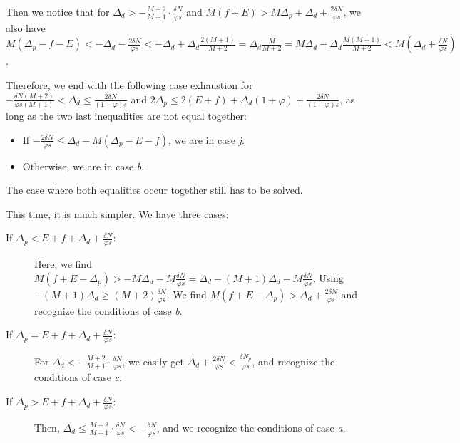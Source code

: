 \documentclass[english, a4paper]{article}
\theoremstyle{plain}
\theoremstyle{definition}
\theoremstyle{remark}
\begin{document}
\begin{description}
\begin{description}
        Then we notice that for $\Delta_d > -\frac{M+2}{M+1}\cdot\frac{\delta N}{\varphi s}$ and $M(f+E) > M\Delta_p + \Delta_d + \frac{2\delta N}{\varphi s}$, we also have $M(\Delta_p - f - E) < -\Delta_d - \frac{2\delta N}{\varphi s} < -\Delta_d + \Delta_d \frac{2(M+1)}{M+2} = \Delta_d \frac{M}{M+2} = M\Delta_d - \Delta_d \frac{M(M+1)}{M+2} < M(\Delta_d + \frac{\delta N}{\varphi s})$.

        Therefore, we end with the following case exhaustion for $-\frac{\delta N(M+2)}{\varphi s(M+1)} < \Delta_d \leq \frac{2\delta N}{(1-\varphi)s}$ and $2\Delta_p \leq 2(E + f) + \Delta_d (1 + \varphi) + \frac{2\delta N}{(1 - \varphi )s}$, as long as the two last inequalities are not equal together:
        \begin{itemize}
            \item If $-\frac{2\delta N}{\varphi s} \leq \Delta_d + M(\Delta_p - E - f)$, we are in case \emph{j}.
            \item Otherwise, we are in case \emph{b}.
        \end{itemize}

        The case where both equalities occur together still has to be solved. %

    \end{description}    
    \item[Case $\Delta_d \leq-\frac{\delta N(M+2)}{\varphi s(M+1)}$:] This time, it is much simpler. We have three cases:
    \begin{description}
        \item[If $\Delta_p < E + f + \Delta_d + \frac{\delta N}{\varphi s}$:] Here, we find $M(f+E-\Delta_p) > -M \Delta_d - M\frac{\delta N}{\varphi s} = \Delta_d - (M+1)\Delta_d - M\frac{\delta N}{\varphi s}$. Using $-(M+1) \Delta_d \geq (M+2)\frac{\delta N}{\varphi s}$. We find $M(f+E - \Delta_p) > \Delta_d + \frac{2 \delta N}{\varphi s}$ and recognize the conditions of case \emph{b}.

        \item[If $\Delta_p = E + f+ \Delta_d + \frac{\delta N}{\varphi s}$:] For $\Delta_d < -\frac{M+2}{M+1}\cdot\frac{\delta N}{\varphi s}$, we easily get $\Delta_d + \frac{2\delta N}{\varphi s} < \frac{\delta N_p}{\varphi s}$, and recognize the conditions of case \emph{c}.

        \item[If $\Delta_p > E + f + \Delta_d + \frac{\delta N}{\varphi s}$:] Then, $\Delta_d \leq \frac{M+2}{M+1}\cdot\frac{\delta N}{\varphi s} < -\frac{\delta N}{\varphi s}$, and we recognize the conditions of case \emph{a}.
    \end{description}
\end{description}
\end{document}
